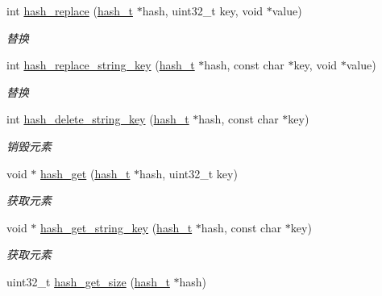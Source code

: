 \begin{DoxyCompactItemize}
int \hyperlink{a00062_a8a53c52f3e2efedc73073989a69aaa7f_a8a53c52f3e2efedc73073989a69aaa7f}{hash\+\_\+replace} (\hyperlink{a00050_a188677c3015513590ab998e96b999966_a188677c3015513590ab998e96b999966}{hash\+\_\+t} $\ast$hash, uint32\+\_\+t key, void $\ast$value)
\begin{DoxyCompactList}\small\item\em 替换 \end{DoxyCompactList}\item 
int \hyperlink{a00062_a204a56cd4efe339f71796a44830e8162_a204a56cd4efe339f71796a44830e8162}{hash\+\_\+replace\+\_\+string\+\_\+key} (\hyperlink{a00050_a188677c3015513590ab998e96b999966_a188677c3015513590ab998e96b999966}{hash\+\_\+t} $\ast$hash, const char $\ast$key, void $\ast$value)
\begin{DoxyCompactList}\small\item\em 替换 \end{DoxyCompactList}\item 
int \hyperlink{a00062_af31ceed9b3d6675a240da0b952492a0c_af31ceed9b3d6675a240da0b952492a0c}{hash\+\_\+delete\+\_\+string\+\_\+key} (\hyperlink{a00050_a188677c3015513590ab998e96b999966_a188677c3015513590ab998e96b999966}{hash\+\_\+t} $\ast$hash, const char $\ast$key)
\begin{DoxyCompactList}\small\item\em 销毁元素 \end{DoxyCompactList}\item 
void $\ast$ \hyperlink{a00062_a8f5065a1ac13afbbec3e2c61355effe3_a8f5065a1ac13afbbec3e2c61355effe3}{hash\+\_\+get} (\hyperlink{a00050_a188677c3015513590ab998e96b999966_a188677c3015513590ab998e96b999966}{hash\+\_\+t} $\ast$hash, uint32\+\_\+t key)
\begin{DoxyCompactList}\small\item\em 获取元素 \end{DoxyCompactList}\item 
void $\ast$ \hyperlink{a00062_a34b1caad9530537c6049ba7090d105a7_a34b1caad9530537c6049ba7090d105a7}{hash\+\_\+get\+\_\+string\+\_\+key} (\hyperlink{a00050_a188677c3015513590ab998e96b999966_a188677c3015513590ab998e96b999966}{hash\+\_\+t} $\ast$hash, const char $\ast$key)
\begin{DoxyCompactList}\small\item\em 获取元素 \end{DoxyCompactList}\item 
uint32\+\_\+t \hyperlink{a00062_a161be6f6ab6de6db3a3a0c3f82ce1607_a161be6f6ab6de6db3a3a0c3f82ce1607}{hash\+\_\+get\+\_\+size} (\hyperlink{a00050_a188677c3015513590ab998e96b999966_a188677c3015513590ab998e96b999966}{hash\+\_\+t} $\ast$hash)

\end{DoxyCompactItemize}
